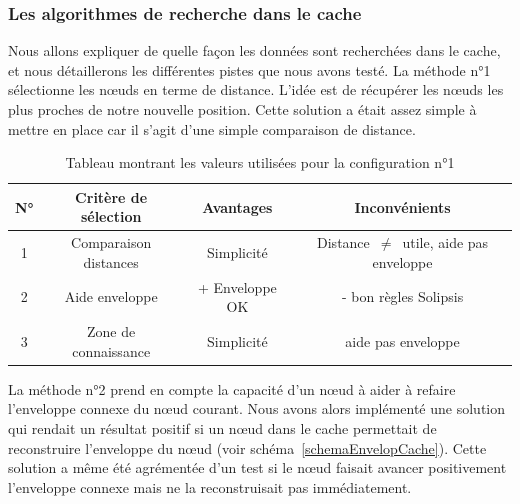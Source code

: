 \subsubsection{Les algorithmes de recherche dans le cache}
\par Nous allons expliquer de quelle façon les données sont recherchées dans le cache, et nous détaillerons les différentes pistes que nous avons testé. La méthode n°1 sélectionne les nœuds en terme de distance. L'idée est de récupérer les nœuds les plus proches de notre nouvelle position. Cette solution a était assez simple à mettre en place car il s'agit d'une simple comparaison de distance. 
\begin{table}[!h]
  \begin{center}
    \begin{tabular}{|c|c|c|c|}
      \hline
      N° & Critère de sélection & Avantages & Inconvénients\\
      \hline
      	1 & Comparaison distances & Simplicité & Distance~$\ne$~utile, aide pas enveloppe\\
      	2 & Aide enveloppe & + Enveloppe OK & - bon règles Solipsis\\
      	3 & Zone de connaissance & Simplicité & aide pas enveloppe\\
      \hline
    \end{tabular}
  \end{center}
  \label{tab:config1}
  \caption{Tableau montrant les valeurs utilisées pour la configuration n°1}
\end{table}


\par La méthode n°2 prend en compte la capacité d'un nœud à aider à refaire l'enveloppe connexe du nœud courant. Nous avons alors implémenté une solution qui rendait un résultat positif si un nœud dans le cache permettait de reconstruire l'enveloppe du nœud (voir schéma~\ref{schemaEnvelopCache}). Cette solution a même été agrémentée d'un test si le nœud faisait avancer positivement l'enveloppe connexe mais ne la reconstruisait pas immédiatement.

